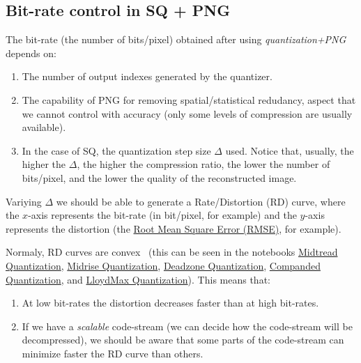 
\subsection{Bit-rate control in SQ + PNG}

The bit-rate (the number of bits/pixel) obtained after using
\emph{quantization+PNG} depends on:
\begin{enumerate}
\item The number of output indexes generated by the quantizer.
\item The capability of PNG for removing spatial/statistical
  redudancy, aspect that we cannot control with accuracy (only some
  levels of compression are usually available).
\item In the case of SQ, the quantization step size $\Delta$
  used. Notice that, usually, the higher the $\Delta$, the higher the
  compression ratio, the lower the number of bits/pixel, and the lower
  the quality of the reconstructed image.
\end{enumerate}
Variying $\Delta$ we should be able to generate a Rate/Distortion (RD)
curve, where the $x$-axis represents the bit-rate (in bit/pixel, for
example) and the $y$-axis represents the distortion (the
\href{https://en.wikipedia.org/wiki/Root-mean-square_deviation}{Root
  Mean Square Error (RMSE)}, for example).

Normaly, RD curves are convex~\cite{vruiz__information_theory} (this
can be seen in the notebooks
\href{https://github.com/Sistemas-Multimedia/Sistemas-Multimedia.github.io/blob/master/contents/scalar_quantization/midtread.ipynb}{Midtread Quantization},
\href{https://github.com/Sistemas-Multimedia/Sistemas-Multimedia.github.io/blob/master/contents/scalar_quantization/midrise.ipynb}{Midrise Quantization},
\href{https://github.com/Sistemas-Multimedia/Sistemas-Multimedia.github.io/blob/master/contents/scalar_quantization/deadzone.ipynb}{Deadzone Quantization},
\href{https://github.com/Sistemas-Multimedia/Sistemas-Multimedia.github.io/blob/master/contents/scalar_quantization/companded.ipynb}{Companded Quantization},
and
\href{https://github.com/Sistemas-Multimedia/Sistemas-Multimedia.github.io/blob/master/contents/scalar_quantization/LloydMax.ipynb}{LloydMax Quantization}). This means that:
\begin{enumerate}
\item At low bit-rates the distortion decreases faster than at high
  bit-rates.
\item If we have a \emph{scalable} code-stream (we can decide how the
  code-stream will be decompressed), we should be aware that some
  parts of the code-stream can minimize faster the RD curve than
  others.
\end{enumerate}

